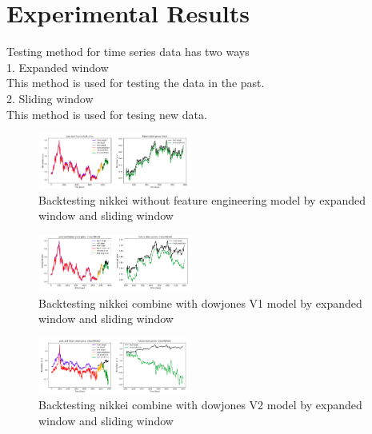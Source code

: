 \documentclass{article}
\begin{document}
\section{Experimental Results}
Testing method for time series data has two ways\\

1. Expanded window\\

This method is used for testing the data in the past.\\

2. Sliding window\\

This method is used for tesing new data.\\



\label{sec:exp}
\label{sec:latex}
\begin{figure}
  \centering
  \centerline{\includegraphics[width=0.45\textwidth]{test1.png}}
  \caption{Backtesting nikkei without feature engineering model by expanded window and sliding window}
  \label{fig:bibtex}
\end{figure}

\label{sec:latex}
\begin{figure}
  \centering
  \centerline{\includegraphics[width=0.45\textwidth]{test2.png}}
  \caption{Backtesting nikkei combine with dowjones V1 model by expanded window and sliding window}
  \label{fig:bibtex}
\end{figure}

\label{sec:latex}
\begin{figure}
  \centering
  \centerline{\includegraphics[width=0.45\textwidth]{test3.png}}
  \caption{Backtesting nikkei combine with dowjones V2 model by expanded window and sliding window}
  \label{fig:bibtex}
\end{figure}
\end{document}
